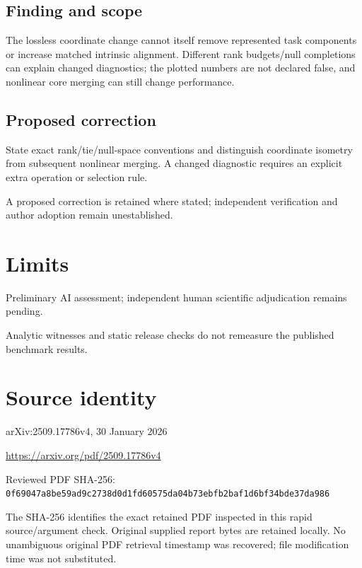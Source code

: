 \documentclass[11pt]{article}
\begin{document}
\subsection*{Finding and scope}

The lossless coordinate change cannot itself remove represented task components or increase matched intrinsic alignment. Different rank budgets/null completions can explain changed diagnostics; the plotted numbers are not declared false, and nonlinear core merging can still change performance.

\subsection*{Proposed correction}

State exact rank/tie/null-space conventions and distinguish coordinate isometry from subsequent nonlinear merging. A changed diagnostic requires an explicit extra operation or selection rule.

A proposed correction is retained where stated; independent verification and author adoption remain unestablished.

\section*{Limits}

Preliminary AI assessment; independent human scientific adjudication remains pending.\par

Analytic witnesses and static release checks do not remeasure the published benchmark results.\par

\section*{Source identity}

arXiv:2509.17786v4, 30 January 2026

\url{https://arxiv.org/pdf/2509.17786v4}

Reviewed PDF SHA-256: \nolinkurl{0f69047a8be59ad9c2738d0d1fd60575da04b73ebfb2baf1d6bf34bde37da986}

The SHA-256 identifies the exact retained PDF inspected in this rapid source/argument check. Original supplied report bytes are retained locally. No unambiguous original PDF retrieval timestamp was recovered; file modification time was not substituted.
\end{document}
